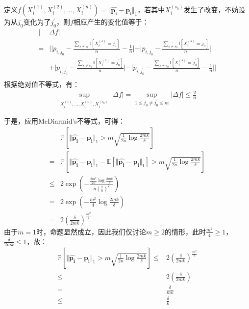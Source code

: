 \documentclass[12pt, a4paper]{article}
\newcommand{\under}[1]{\mathop{#1}\limits_}
\newcommand{\expect}{{\mathbb{E}}}
\newcommand{\unit}{{\mathbb{I}}}
\newcommand{\prob}{{\mathbb{P}}}
\begin{document}
\begin{enumerate}
        定义$f(X_i^{(1)}, X_i^{(2)}, ..., X_i^{(n)}) = \Vert \bm{\hat{p_i}} - \bm{p_i} \Vert_1$，若其中$X_i^{(s_0)}$发生了改变，不妨设为从$j_0$变化为了$j_0^\prime$，则$f$相应产生的变化值等于：
        \begin{align*}
        \vert &\Delta f \vert \\
        =& \vert \vert p_{i, j_0} - \frac{\sum_{s \ne s_0} \unit[X_i^{(s)} = j_0]}{n} - \frac{1}{n} \vert - \vert p_{i, j_0} - \frac{\sum_{s \ne s_0} \unit[X_i^{(s)} = j_0]}{n} \vert \\
        &+ \vert p_{i, j_0^\prime} - \frac{\sum_{s \ne s_0} \unit[X_i^{(s)} = j_0^\prime]}{n} \vert - \vert p_{i, j_0^\prime} - \frac{\sum_{s \ne s_0} \unit[X_i^{(s)} = j_0^\prime]}{n} - \frac{1}{n} \vert \vert \\
        \end{align*}
        根据绝对值不等式，有：
        \begin{align*}
        \under{\sup}{X_i^{(1)}, ..., X_i^{(n)}, X_i^{(s_0)^\prime}} \vert \Delta f \vert = \under{\sup}{1 \le j_0 \ne j_0^\prime \le m} \vert \Delta f \vert \le \frac{2}{n}
        \end{align*}

        于是，应用McDiarmid's不等式，可得：
        \begin{align*}
        &\prob[\Vert \bm{\hat{p_i}} - \bm{p_i} \Vert_1 > m \sqrt{\frac{1}{2n} \log \frac{2 m k}{\delta}}] \\
        =& \prob[\Vert \bm{\hat{p_i}} - \bm{p_i} \Vert_1 - \expect[\Vert \bm{\hat{p_i}} - \bm{p_i} \Vert_1] > m \sqrt{\frac{1}{2n} \log \frac{2 m k}{\delta}}] \\
        \le& 2 \exp(- \frac{\frac{2 m^2}{2n} \log \frac{2 m k}{\delta}}{n (\frac{2}{n})^2}) \\
        =& 2 \exp(- \frac{m^2}{4} \log \frac{2 m k}{\delta}) \\
        =& 2 (\frac{\delta}{2 m k})^{\frac{m^2}{4}}
        \end{align*}
        由于$m = 1$时，命题显然成立，因此我们仅讨论$m \ge 2$的情形，此时$\frac{m^2}{4} \ge 1$，$\frac{\delta}{2 m k} \le 1$，故：
        \begin{align*}
        \prob[\Vert \bm{\hat{p_i}} - \bm{p_i} \Vert_1 > m \sqrt{\frac{1}{2n} \log \frac{2 m k}{\delta}}]
        \le& 2 (\frac{\delta}{2 m k})^{\frac{m^2}{4}} \\
        \le& 2 (\frac{\delta}{2 m k}) \\
        =& \frac{\delta}{m k} \\
        \le& \frac{\delta}{k}
        \end{align*}


\end{enumerate}
\end{document}
